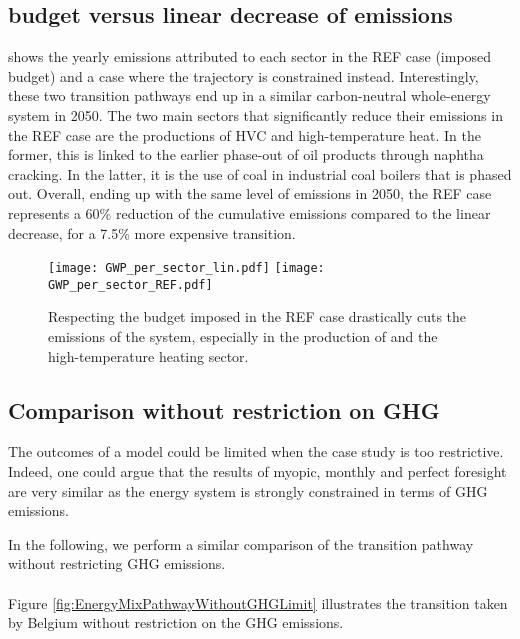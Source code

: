 \subsection{ budget versus linear decrease of emissions}
\label{app:CO2_budget}

 shows the yearly emissions attributed to each sector in the REF case (\ie imposed  budget) and a case where the  trajectory is constrained instead. Interestingly, these two transition pathways end up in a similar carbon-neutral whole-energy system in 2050. The two main sectors that significantly reduce their emissions in the REF case are the productions of \gls{HVC} and high-temperature heat. In the former, this is linked to the earlier phase-out of oil products through naphtha cracking. In the latter, it is the use of coal in industrial coal boilers that is phased out. Overall, ending up with the same level of emissions in 2050, the REF case represents a 60\% reduction of the cumulative emissions compared to the linear decrease, for a 7.5\% more expensive transition.

\begin{figure}[htbp!]
\centering
\texttt{[image: GWP\_per\_sector\_lin.pdf]}
\texttt{[image: GWP\_per\_sector\_REF.pdf]}
\caption{Respecting the  budget imposed in the REF case drastically cuts the emissions of the system, especially in the production of  and the high-temperature heating sector.}
\label{fig:app_CO2_REF_lin}
\end{figure}

\subsection{Comparison without restriction on \gls{GHG}}
\label{app:pfmomy_comparison_without_GHG}

The outcomes of a model could be limited when the case study is too restrictive. Indeed, one could argue that the results of myopic, monthly and perfect foresight are very similar as the energy system is strongly constrained in terms of \gls{GHG} emissions.

In the following, we perform a similar comparison of the transition pathway without restricting \gls{GHG} emissions. \\

\\

\noindent
Figure \ref{fig:EnergyMixPathwayWithoutGHGLimit} illustrates the transition taken by Belgium without restriction on the \gls{GHG} emissions. 

